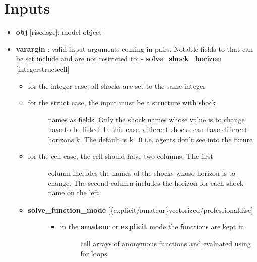 \documentclass[letterpaper,10pt,english]{sphinxmanual}
\begin{document}
\section{Inputs}
\label{classes/models/@dsge/dsge:id151}\begin{itemize}
\item {} 
\textbf{obj} {[}rise\textbar{}dsge{]}: model object

\item {} 
\textbf{varargin} : valid input arguments coming in pairs. Notable fields to
that can be set include and are not restricted to:
- \textbf{solve\_shock\_horizon} {[}integer\textbar{}struct\textbar{}cell{]}
\begin{itemize}
\item {} 
for the integer case, all shocks are set to the same integer

\item {} \begin{description}
\item[{for the struct case, the input must be a structure with shock}] \leavevmode
names as fields. Only the shock names whose value is to change
have to be listed. In this case, different shocks can have
different horizons k. The default is k=0 i.e. agents don't
see into the future

\end{description}

\item {} \begin{description}
\item[{for the cell case, the cell should have two columns. The first}] \leavevmode
column includes the names of the shocks whose horizon is to
change. The second column includes the horizon for each shock
name on the left.

\end{description}

\end{itemize}
\begin{itemize}
\item {} \begin{description}
\item[{\textbf{solve\_function\_mode} {[}\{explicit/amateur\}\textbar{}vectorized/professional\textbar{}disc{]}}] \leavevmode\begin{itemize}
\item {} \begin{description}
\item[{in the \textbf{amateur} or \textbf{explicit} mode the functions are kept in}] \leavevmode
cell arrays of anonymous functions and evaluated using for
loops


\end{description}
\end{itemize}
\end{description}
\end{itemize}
\end{itemize}
\end{document}
